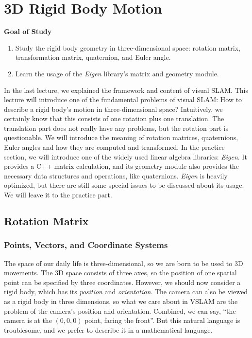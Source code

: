\chapter{3D Rigid Body Motion}
\label{cpt:3}

\begin{mdframed}
	\textbf{Goal of Study}
	\begin{enumerate}
		\item Study the rigid body geometry in three-dimensional space: rotation matrix, transformation matrix, quaternion, and Euler angle.
		\item Learn the usage of the \textit{Eigen} library's matrix and geometry module.
	\end{enumerate}
\end{mdframed}

In the last lecture, we explained the framework and content of visual SLAM. This lecture will introduce one of the fundamental problems of visual SLAM: How to describe a rigid body's motion in three-dimensional space? Intuitively, we certainly know that this consists of one rotation plus one translation. The translation part does not really have any problems, but the rotation part is questionable. We will introduce the meaning of rotation matrices, quaternions, Euler angles and how they are computed and transformed. In the practice section, we will introduce one of the widely used linear algebra libraries: \textit{Eigen}. It provides a C++ matrix calculation, and its geometry module also provides the necessary data structures and operations, like quaternions. \textit{Eigen} is heavily optimized, but there are still some special issues to be discussed about its usage. We will leave it to the practice part.

\newpage

\newpage

\section{Rotation Matrix}
\label{sec:3.1}
\subsection{Points, Vectors, and Coordinate Systems}
The space of our daily life is three-dimensional, so we are born to be used to 3D movements. The 3D space consists of three axes, so the position of one spatial point can be specified by three coordinates. However, we should now consider a rigid body, which has its \textit{position} and \textit{orientation}. The camera can also be viewed as a rigid body in three dimensions, so what we care about in VSLAM are the problem of the camera's position and orientation.  Combined, we can say, ``the camera is at the $( 0, 0, 0)$ point, facing the front''. But this natural language is troublesome, and we prefer to describe it in a mathematical language.


